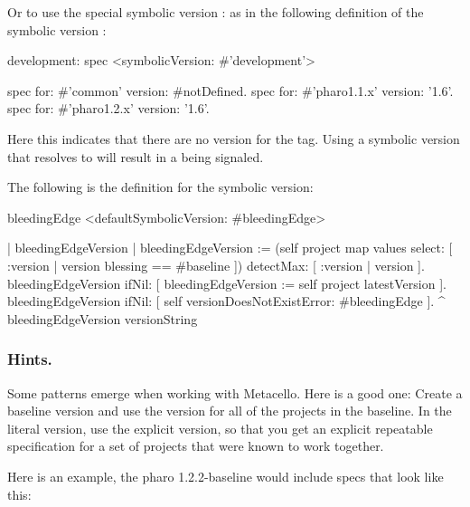\documentclass[a4paper,10pt,twoside]{book}
\begin{document}
Or to use the special symbolic version : as in the following definition of the symbolic version :

\begin{code}{}
development: spec
	<symbolicVersion: #'development'>

	spec for: #'common' version: #notDefined.
	spec for: #'pharo1.1.x' version: '1.6'.
	spec for: #'pharo1.2.x' version: '1.6'.
\end{code}

Here this indicates that there are no version for the  tag. 
Using a symbolic version that resolves to  will result in a  being signaled.

The following is the definition for the  symbolic version: 

\begin{code}{}
bleedingEdge
	<defaultSymbolicVersion: #bleedingEdge>

	| bleedingEdgeVersion |
	bleedingEdgeVersion := (self project map values select: [ :version |
version blessing == #baseline ])
		detectMax: [ :version | version ].
	bleedingEdgeVersion ifNil: [ bleedingEdgeVersion := self project
latestVersion ].
	bleedingEdgeVersion
		ifNil: [ self versionDoesNotExistError: #bleedingEdge ].
	^ bleedingEdgeVersion versionString
\end{code}


\subsubsection{Hints.}
Some patterns emerge when working with Metacello. Here is a good one: 
Create a baseline version and use the  version for all of the projects in the baseline. In the literal version, use the explicit version, so that you get an explicit repeatable specification for a set of projects that were known to work together.

Here is an example, the pharo 1.2.2-baseline would include specs that look like this:
\end{document}
